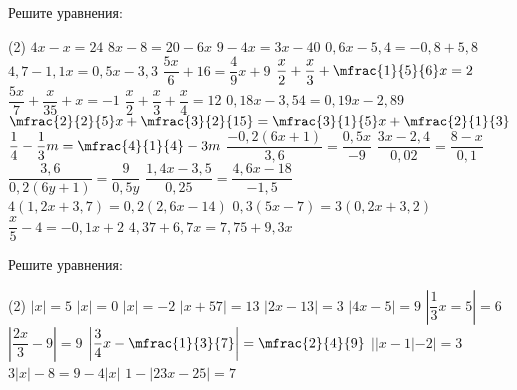 %			
%

\begin{class}[number=2]
	\begin{listofex}
		\item Решите уравнения: %
		\begin{tasks}(2)
			\task \( 4x-x=24 \)
			\task \( 8x-8=20-6x \)
			\task \( 9-4x=3x-40 \)
			\task \( 0,6x-5,4=-0,8+5,8 \)
			\task \( 4,7-1,1x=0,5x-3,3 \)
			\task \( \dfrac{5x}{6}+16=\dfrac{4}{9}x+9 \)
			\task \( \dfrac{x}{2}+\dfrac{x}{3}+\mfrac{1}{5}{6}x=2 \)
			\task \( \dfrac{5x}{7}+\dfrac{x}{35}+x=-1 \)
			\task \( \dfrac{x}{2}+\dfrac{x}{3}+\dfrac{x}{4}=12 \)
			\task \( 0,18x-3,54=0,19x-2,89 \)
			\task \( \mfrac{2}{2}{5}x+ \mfrac{3}{2}{15}=\mfrac{3}{1}{5}x + \mfrac{2}{1}{3} \)
			\task \( \dfrac{1}{4} - \dfrac{1}{3}m=\mfrac{4}{1}{4}-3m \)
			\task \( \dfrac{-0,2(6x+1)}{3,6}=\dfrac{0,5x}{-9} \)
			\task \( \dfrac{3x-2,4}{0,02}=\dfrac{8-x}{0,1} \)
			\task \( \dfrac{3,6}{0,2(6y+1)}=\dfrac{9}{0,5y} \)
			\task \( \dfrac{1,4x-3,5}{0,25}=\dfrac{4,6x-18}{-1,5} \)
			\task \( 4(1,2x+3,7)=0,2(2,6x-14) \)
			\task \( 0,3(5x-7)=3(0,2x+3,2) \)
			\task \( \dfrac{x}{5}-4=-0,1x+2 \)
			\task \( 4,37+6,7x=7,75+9,3x \)
		\end{tasks}
		\item Решите уравнения: %
		\begin{tasks}(2)
			\task \( |x|=5 \)
			\task \( |x|=0 \)
			\task \( |x|=-2 \)
			\task \( |x+57|=13 \)
			\task \( |2x-13|=3 \)
			\task \( |4x-5|=9 \)
			\task \( \left| \dfrac{1}{3}x=5 \right|=6 \)
			\task \( \left| \dfrac{2x}{3}-9 \right|=9 \)
			\task \( \left| \dfrac{3}{4}x-\mfrac{1}{3}{7} \right|=\mfrac{2}{4}{9} \)
			\task \( ||x-1|-2|=3 \)
			\task \( 3|x|-8=9-4|x| \)
			\task \( 1-|23x-25|=7 \)
		\end{tasks}
		
	\end{listofex}
\end{class}

